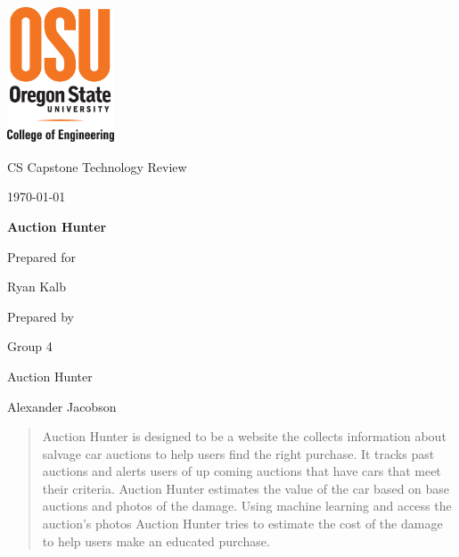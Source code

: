 \documentclass[onecolumn, draftclsnofoot,10pt, compsoc]{IEEEtran}
\def \CapstoneTeamName{		    Auction Hunter}
\def \CapstoneTeamNumber{		4}
\def \GroupMemberOne{			Alexander Hull}
\def \GroupMemberTwo{			Alexander Jacobson}
\def \GroupMemberThree{			Yufei Zeng}
\def \CapstoneProjectName{		Auction Hunter}
\def \CapstoneSponsorCompany{	Ryan Kalb}
\def \CapstoneSponsorPerson{    Ryan Kalb}
\def \DocType{	%
				Technology Review
				}
\newcommand{\NameSigPair}[1]{\par
\makebox[2.75in][r]{#1} \hfil 	\makebox[3.25in]{\makebox[2.25in]{\hrulefill} \hfill		\makebox[.75in]{\hrulefill}}
\par\vspace{-12pt} \textit{\tiny\noindent
\makebox[2.75in]{} \hfil		\makebox[3.25in]{\makebox[2.25in][r]{Signature} \hfill	\makebox[.75in][r]{Date}}}}
\renewcommand{\NameSigPair}[1]{#1}
\begin{document}
\begin{titlepage}
    \begin{singlespace}
    	\includegraphics[height=4cm]{coe_v_spot1}
        \hfill 
        \par\vspace{.2in}
        \centering
        \scshape{
            \huge CS Capstone \DocType \par
            {\large\today}\par
            \vspace{.5in}
            \textbf{\Huge\CapstoneProjectName}\par
            \vfill
            {\large Prepared for}\par
            \Huge \CapstoneSponsorCompany\par
            \vspace{5pt}
            {\large Prepared by }\par
            Group\CapstoneTeamNumber\par
            \CapstoneTeamName\par 
            \vspace{5pt}
            {\Large
                \NameSigPair{\GroupMemberTwo}\par
            }
            \vspace{20pt}
        }
        \begin{abstract}
        	Auction Hunter is designed to be a website the collects information about salvage car auctions to help users find the right purchase.
        	It tracks past auctions and alerts users of up coming auctions that have cars that meet their criteria. 
        	Auction Hunter estimates the value of the car based on base auctions and photos of the damage.
        	Using machine learning and access the auction's photos Auction Hunter tries to estimate the cost of the damage to help users make an educated purchase. 
        \end{abstract}     
    \end{singlespace}
\end{titlepage}
\newpage
{}
\tableofcontents
\clearpage
\end{document}

